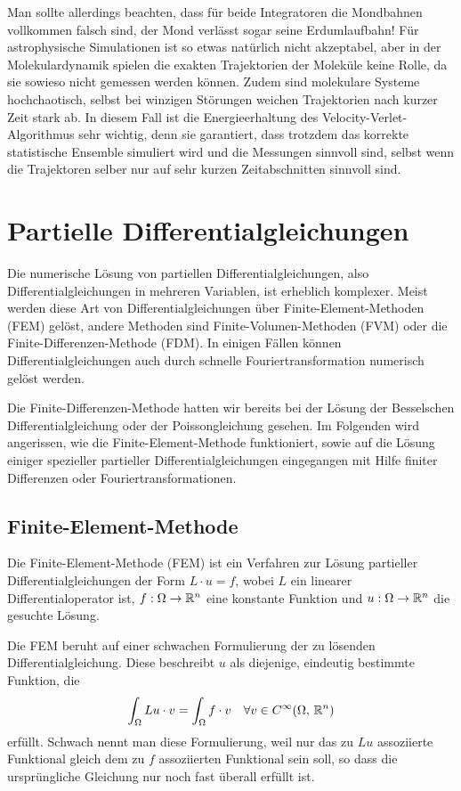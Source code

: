 Man sollte allerdings beachten, dass für beide Integratoren die
Mondbahnen vollkommen falsch sind, der Mond verlässt sogar seine
Erdumlaufbahn! Für astrophysische Simulationen ist so etwas natürlich
nicht akzeptabel, aber in der Molekulardynamik spielen die exakten
Trajektorien der Moleküle keine Rolle, da sie sowieso nicht gemessen
werden können. Zudem sind molekulare Systeme hochchaotisch, \dh
selbst bei winzigen Störungen weichen Trajektorien nach kurzer Zeit
stark ab. In diesem Fall ist die Energieerhaltung des
Velocity-Verlet-Algorithmus sehr wichtig, denn sie garantiert, dass
trotzdem das korrekte statistische Ensemble simuliert wird und die
Messungen sinnvoll sind, selbst wenn die Trajektoren selber nur auf
sehr kurzen Zeitabschnitten sinnvoll sind.

\section{Partielle Differentialgleichungen}

Die numerische Lösung von partiellen Differentialgleichungen, also
Differentialgleichungen in mehreren Variablen, ist erheblich
komplexer. Meist werden diese Art von Differentialgleichungen über
Finite-Element-Methoden (FEM) gelöst, andere Methoden sind
Finite-Volumen-Methoden (FVM) oder die Finite-Differenzen-Methode
(FDM). In einigen Fällen können Differentialgleichungen auch durch
schnelle Fouriertransformation numerisch gelöst werden.

Die Finite-Differenzen-Methode hatten wir bereits bei der Lösung der
Besselschen Differentialgleichung oder der Poissongleichung gesehen.
Im Folgenden wird angerissen, wie die Finite-Element-Methode
funktioniert, sowie auf die Lösung einiger spezieller partieller
Differentialgleichungen eingegangen mit Hilfe finiter Differenzen oder
Fouriertransformationen.

\subsection{Finite-Element-Methode}

Die Finite-Element-Methode (FEM) ist ein Verfahren zur Lösung
partieller Differentialgleichungen der Form $L\cdot u = f$, wobei $L$
ein linearer Differentialoperator ist, $f:\Omega\to\mathbb{R}^n$ eine
konstante Funktion und $u:\Omega\to\mathbb{R}^n$ die gesuchte Lösung.

Die FEM beruht auf einer schwachen Formulierung der zu lösenden
Differentialgleichung. Diese beschreibt $u$ als diejenige, eindeutig
bestimmte Funktion, die
\begin{equation}
  \label{eq:fem}
  \int_\Omega Lu\cdot v = \int_\Omega f\cdot v\quad\forall v\in
  C^\infty(\Omega,\, \mathbb{R}^n)
\end{equation}
erfüllt. Schwach nennt man diese Formulierung, weil nur das zu $Lu$
assoziierte Funktional gleich dem zu $f$ assoziierten Funktional sein
soll, so dass die ursprüngliche Gleichung nur noch fast überall
erfüllt ist.

